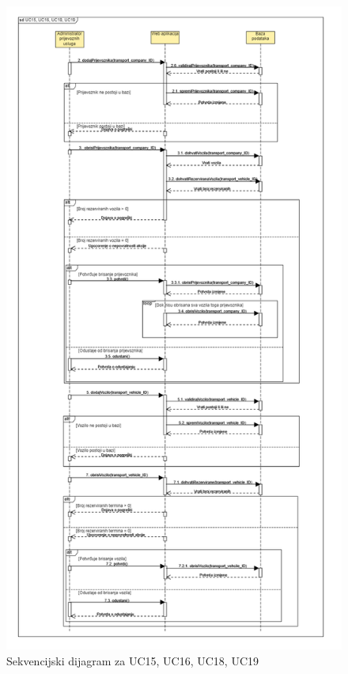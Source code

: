 				\begin{figure}[H]
					\includegraphics[scale=0.45]{slike/sd3.PNG} %
					\centering
					\caption{Sekvencijski dijagram za UC15, UC16, UC18, UC19}
					\label{fig:sd3} %
				\end{figure}
				
